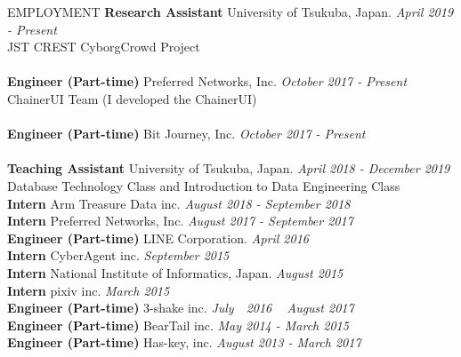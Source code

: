 \documentclass{resume} %
\begin{document}
\begin{rSection}{EMPLOYMENT}
{\bf Research Assistant} University of Tsukuba, Japan. \hfill {\em April 2019 - Present}
\\ JST CREST CyborgCrowd Project
\\\\
{\bf Engineer (Part-time) } Preferred Networks, Inc. \hfill {\em October 2017 - Present}
\\ ChainerUI Team (I developed the ChainerUI)
\\\\
{\bf Engineer (Part-time) } Bit Journey, Inc. \hfill {\em October 2017 - Present} 
\\\\
{\bf Teaching Assistant } University of Tsukuba, Japan. \hfill {\em April 2018 - December 2019} 
\\ Database Technology Class and Introduction to Data Engineering Class
\\
{\bf Intern } Arm Treasure Data inc. \hfill {\em August 2018 - September 2018}
\\
{\bf Intern } Preferred Networks, Inc. \hfill {\em August 2017 - September 2017} 
\\
{\bf Engineer (Part-time) } LINE Corporation. \hfill {\em April 2016}
\\
{\bf Intern } CyberAgent inc. \hfill {\em September 2015}
\\
{\bf Intern } National Institute of Informatics, Japan. \hfill {\em August 2015}
\\
{\bf Intern } pixiv inc. \hfill {\em March 2015}
\\
{\bf Engineer (Part-time) } 3-shake inc. \hfill {\em July　2016 ~ August 2017}
\\
{\bf Engineer (Part-time) } BearTail inc. \hfill {\em May 2014 - March 2015}
\\
{\bf Engineer (Part-time) } Has-key, inc. \hfill {\em August 2013 - March 2017}
\end{rSection}



\end{document}
